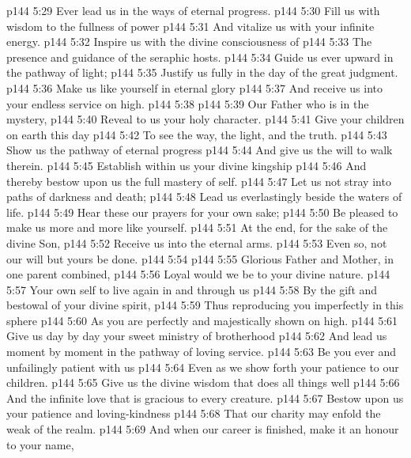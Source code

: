 \vs p144 5:29 \hsetoff Ever lead us in the ways of eternal progress.
\vs p144 5:30 Fill us with wisdom to the fullness of power
\vs p144 5:31 \hsetoff And vitalize us with your infinite energy.
\vs p144 5:32 Inspire us with the divine consciousness of
\vs p144 5:33 \hsetoff The presence and guidance of the seraphic hosts.
\vs p144 5:34 Guide us ever upward in the pathway of light;
\vs p144 5:35 \hsetoff Justify us fully in the day of the great judgment.
\vs p144 5:36 Make us like yourself in eternal glory
\vs p144 5:37 \hsetoff And receive us into your endless service on high.
\vs p144 5:38 \separatorshort
\vs p144 5:39 Our Father who is in the mystery,
\vs p144 5:40 \hsetoff Reveal to us your holy character.
\vs p144 5:41 Give your children on earth this day
\vs p144 5:42 \hsetoff To see the way, the light, and the truth.
\vs p144 5:43 Show us the pathway of eternal progress
\vs p144 5:44 \hsetoff And give us the will to walk therein.
\vs p144 5:45 Establish within us your divine kingship
\vs p144 5:46 \hsetoff And thereby bestow upon us the full mastery of self.
\vs p144 5:47 Let us not stray into paths of darkness and death;
\vs p144 5:48 \hsetoff Lead us everlastingly beside the waters of life.
\vs p144 5:49 Hear these our prayers for your own sake;
\vs p144 5:50 \hsetoff Be pleased to make us more and more like yourself.
\vs p144 5:51 At the end, for the sake of the divine Son,
\vs p144 5:52 \hsetoff Receive us into the eternal arms.
\vs p144 5:53 Even so, not our will but yours be done.
\vs p144 5:54 \separatorshort
\vs p144 5:55 Glorious Father and Mother, in one parent combined,
\vs p144 5:56 \hsetoff Loyal would we be to your divine nature.
\vs p144 5:57 Your own self to live again in and through us
\vs p144 5:58 \hsetoff By the gift and bestowal of your divine spirit,
\vs p144 5:59 Thus reproducing you imperfectly in this sphere
\vs p144 5:60 \hsetoff As you are perfectly and majestically shown on high.
\vs p144 5:61 Give us day by day your sweet ministry of brotherhood
\vs p144 5:62 \hsetoff And lead us moment by moment in the pathway of loving service.
\vs p144 5:63 Be you ever and unfailingly patient with us
\vs p144 5:64 \hsetoff Even as we show forth your patience to our children.
\vs p144 5:65 Give us the divine wisdom that does all things well
\vs p144 5:66 \hsetoff And the infinite love that is gracious to every creature.
\vs p144 5:67 Bestow upon us your patience and loving\hyp{}kindness
\vs p144 5:68 \hsetoff That our charity may enfold the weak of the realm.
\vs p144 5:69 And when our career is finished, make it an honour to your name,
